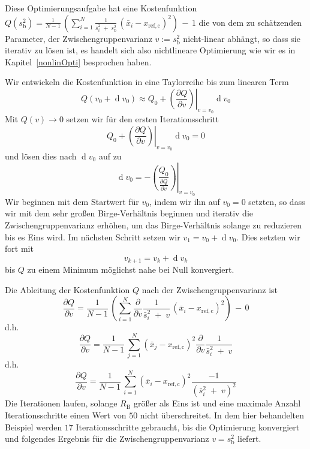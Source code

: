 Diese Optimierungsaufgabe hat eine Kostenfunktion
$Q(s^2_\mathrm{b}) = \frac{1}{N-1} \, \left( \sum\limits_{i=1}^N
\frac{1}{\bar s^2_i \; + \; s^2_\mathrm{b}} \, \left(\bar x_i - x_\mathrm{ref, c}\right)^2  \right) \, - \, 1$
die von dem zu schätzenden Parameter, der Zwischengruppenvarianz
$v := s^2_\mathrm{b}$ nicht-linear abhängt, so dass sie iterativ zu lösen ist, es handelt sich also
nichtlineare Optimierung wie wir es in Kapitel~\ref{nonlinOpti} besprochen haben.

Wir entwickeln die Kostenfunktion in
eine Taylorreihe bis zum linearen Term
\begin{equation}
Q(v_0 + \operatorname{d} v_0) \approx
Q_0 + \left.\left( \frac{\partial Q}{\partial v}\right)
\right|_{v=v_0} \operatorname{d} v_0
\end{equation}
Mit $Q(v) \rightarrow 0$ setzen wir für den ersten
Iterationsschritt
\begin{equation}
Q_0 + \left.\left( \frac{\partial Q}{\partial v}\right)
\right|_{v=v_0} \operatorname{d} v_0 = 0
\end{equation}
und lösen dies nach $\operatorname{d} v_0$ auf zu
\begin{equation}
\operatorname{d} v_0 = -\left. \left( \frac{Q_0}{\frac{\partial Q}{\partial v}}\right) \right| _{v=v_0}
\end{equation}
Wir beginnen mit dem Startwert für $v_0$, indem wir ihn auf $v_0 = 0$ setzten, so dass wir
mit dem sehr großen Birge-Verhältnis beginnen und iterativ die Zwischengruppenvarianz
erhöhen, um das Birge-Verhältnis solange zu reduzieren bis es Eins wird.
Im nächsten Schritt setzen wir $v_1 = v_0 + \operatorname{d} v_0$.
Dies setzten wir fort mit
\begin{equation}
v_{k+1} =v_k + \operatorname{d} v_k
\end{equation}
bis $Q$ zu einem Minimum möglichst nahe bei Null konvergiert.

Die Ableitung der Kostenfunktion $Q$ nach der Zwischengruppenvarianz ist
\begin{equation*}
\frac{\partial Q}{\partial v} = \frac{1}{N-1} \, \left( \sum\limits_{i=1}^N
\frac{\partial }{\partial v} \frac{1}{\bar s^2_i \; + \; v} \, \left(\bar x_i - x_\mathrm{ref, c}\right)^2  \right) \, - \, 0
\end{equation*}
d.h.
\begin{equation*}
\frac{\partial Q}{\partial v} = \frac{1}{N-1} \, \sum\limits_{j=1}^N  \left(\bar x_j - x_\mathrm{ref, c}\right)^2
\frac{\partial }{\partial v} \frac{1}{\bar s^2_i \; + \; v}
\end{equation*}
d.h.
\begin{equation}
\frac{\partial Q}{\partial v} = \frac{1}{N-1} \, \sum\limits_{i=1}^N  \left(\bar x_i - x_\mathrm{ref, c}\right)^2
\frac{-1}{\left(\bar s^2_i \; + \; v\right)^2}
\end{equation}
Die Iterationen laufen, solange $R_\mathrm{B}$ größer als Eins ist und eine maximale Anzahl Iterationsschritte einen Wert von $50$ nicht überschreitet.
In dem hier behandelten Beispiel werden $17$ Iterationsschritte gebraucht, bis die
Optimierung konvergiert und folgendes Ergebnis für die Zwischengruppenvarianz $v = s^2_\mathrm{b}$ liefert.

